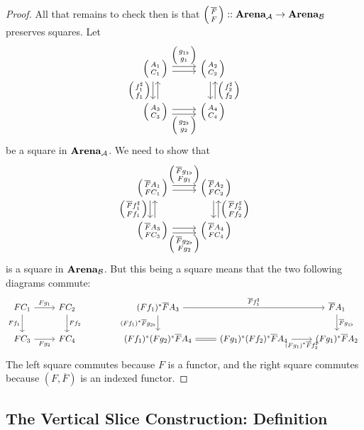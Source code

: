 \documentclass[DynamicalBook]{subfiles}
\begin{document}
\begin{proof}
All that remains to check then is that
  $\lens{\overline{F}}{F} ::\Cat{Arena}_{\cat{A}} \to \Cat{Arena}_{\cat{B}}$
  preserves squares. Let 
\[
    \begin{tikzcd}
      \lens{A_1}{C_1} \arrow[r, shift left, "\lens{g_{1\flat}}{g_1}"]\arrow[r, shift right] \arrow[d, leftarrow,  shift left] \arrow[d, shift right, "\lens{f_1^{\sharp}}{f_1}"'] & \lens{A_2}{C_2} \arrow[d, leftarrow, shift left, "\lens{f_2^{\sharp}}{f_2}"] \arrow[d, shift right] \\
      \lens{A_3}{C_3} \arrow[r, shift left]\arrow[r, shift right,
      "\lens{g_{2\flat}}{g_2}"'] & \lens{A_4}{C_4}
    \end{tikzcd}
\]
be a square in $\textbf{Arena}_{\mathcal{A}}$. We need to show that 
\[
    \begin{tikzcd}
      \lens{\overline{F}A_1}{FC_1} \arrow[r, shift left, "\lens{\overline{F}g_{1\flat}}{Fg_1}"]\arrow[r, shift right] \arrow[d, leftarrow,  shift left] \arrow[d, shift right, "\lens{\overline{F}f_1^{\sharp}}{Ff_1}"'] & \lens{\overline{F}A_2}{FC_2} \arrow[d, leftarrow, shift left, "\lens{\overline{F}f_2^{\sharp}}{Ff_2}"] \arrow[d, shift right] \\
      \lens{\overline{F}A_3}{FC_3} \arrow[r, shift left]\arrow[r, shift right,
      "\lens{\overline{F}g_{2\flat}}{Fg_2}"'] & \lens{\overline{F}A_4}{FC_4}
    \end{tikzcd}
\]
is a square in $\textbf{Arena}_{\mathcal{B}}$. But this being a square means that the
two following diagrams commute:
\[
    \begin{tikzcd}
      FC_1 \arrow[r, "Fg_1"] \arrow[d, "Ff_1"'] & FC_2 \arrow[d, "Ff_2"] &  & (F f_1 )^{\ast}\overline{F}A_3 \arrow[rr, "\overline{F}f_1^{\sharp}"] \arrow[d, "(Ff_1)^{\ast}\overline{F}g_{2\flat}"'] &                                                              & \overline{F}A_1 \arrow[d, "\overline{F}g_{1\flat}"] \\
      FC_3 \arrow[r, "Fg_2"'] & FC_4 & & (Ff_1)^{\ast}(Fg_2)^{\ast}\overline{F}A_4 \arrow[r, equals]
      & (Fg_1)^{\ast}(Ff_2)^{\ast}\overline{F}A_4 \arrow[r, "(Fg_1)^{\ast}\overline{F}f_2^{\sharp}"'] &
      (Fg_1)^{\ast}\overline{F}A_2
    \end{tikzcd}
\]
The left square commutes because $F$ is a functor, and the right square commutes
because $(F, \overline{F})$ is an indexed functor.
\end{proof}

\subsection{The Vertical Slice Construction: Definition}
\end{document}
